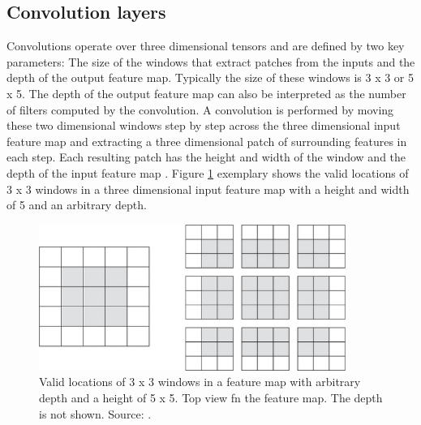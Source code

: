 \subsection{Convolution layers}
\label{convolution_layers}
Convolutions operate over three dimensional tensors and are defined by two key parameters: The size of the windows that extract patches from the inputs and the depth of the output feature map. Typically the size of these windows is 3 x 3 or 5 x 5. The depth of the output feature map can also be interpreted as the number of filters computed by the convolution. A convolution is performed by moving these two dimensional windows step by step across the three dimensional input feature map and extracting a three dimensional patch of surrounding features in each step. Each resulting patch has the height and width of the window and the depth of the input feature map \cite[Chapter~5]{cnn}. Figure \ref{fig:loc} exemplary shows the valid locations of 3 x 3 windows in a three dimensional input feature map with a height and width of 5 and an arbitrary depth.



\begin{figure}[H]
	\centering
	\includegraphics[width=10cm]{images/nn/loc.jpg}
	\caption[Valid locations of 3 x 3 windows in a feature map.]{Valid locations of 3 x 3 windows in a feature map with arbitrary depth and a height of 5 x 5. Top view fn the feature map. The depth is not shown.  Source: \cite[Chapter~5]{cnn}.}
	\label{fig:loc}
\end{figure}

